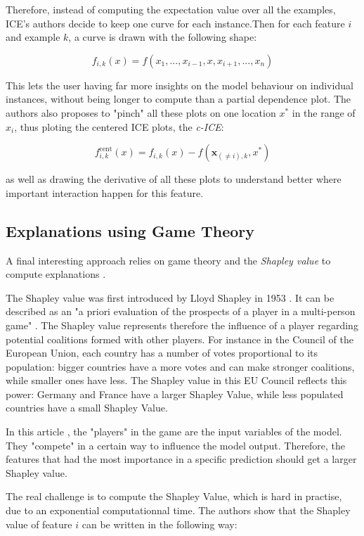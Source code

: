 \documentclass[a4paper,11pt]{kth-mag}
\begin{document}
Therefore, instead of computing the expectation value over all the examples, ICE's authors decide to keep one curve for each instance.Then for each feature $i$ and example $k$, a curve is drawn with the following shape:

\[
	f_{i,k}(x) = f(x_1, ..., x_{i-1}, x, x_{i+1}, ..., x_n)
\]

This lets the user having far more insights on the model behaviour on individual instances, without being longer to compute than a partial dependence plot. The authors also proposes to "pinch" all these plots on one location $x^*$ in the range of $x_i$, thus ploting the centered ICE plots, the \textit{c-ICE}:

\[
	f^\mathrm{cent}_{i,k}(x) = f_{i,k}(x) - f(\mathbf{x}_{(\neq i),k}, x^*)
\]

as well as drawing the derivative of all these plots to understand better where important interaction happen for this feature.

\subsection{Explanations using Game Theory}

A final interesting approach relies on game theory and the \textit{Shapley value} to compute explanations \cite{gametheory}.

The Shapley value was first introduced by Lloyd Shapley in 1953 \cite{shapleyvalue}. It can be described as an "a priori evaluation of the prospects of a player in a multi-person game" \cite{hart1989shapley}. The Shapley value represents therefore the influence of a player regarding potential coalitions formed with other players. For instance in the Council of the European Union, each country has a number of votes proportional to its population: bigger countries have a more votes and can make stronger coalitions, while smaller ones have less. The Shapley value in this EU Council reflects this power: Germany and France have a larger Shapley Value, while less populated countries have a small Shapley Value. 

In this article \cite{gametheory}, the "players" in the game are the input variables of the model. They "compete" in a certain way to influence the model output. Therefore, the features that had the most importance in a specific prediction should get a larger Shapley value.

The real challenge is to compute the Shapley Value, which is hard in practise, due to an exponential computationnal time. The authors show that the Shapley value of feature $i$ can be written in the following way:
\end{document}
